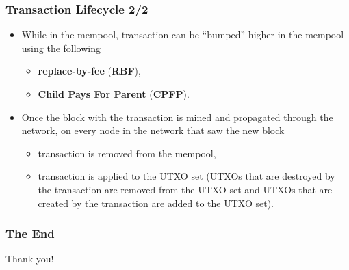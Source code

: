 \documentclass{beamer}
\begin{document}
\begin{frame}
  \frametitle{Transaction Lifecycle 2/2}
  \begin{itemize}
  \item While in the mempool, transaction can be ``bumped'' higher in the mempool
    using the following
    \begin{itemize}
    \item \textbf{replace-by-fee} (\textbf{RBF}),
    \item \textbf{Child Pays For Parent} (\textbf{CPFP}).
    \end{itemize}
  \item Once the block with the transaction is mined and propagated through the
    network, on every node in the network that saw the new block
    \begin{itemize}
    \item transaction is removed from the mempool,
    \item transaction is applied to the UTXO set (UTXOs that are destroyed by
      the transaction are removed from the UTXO set and UTXOs that are created
      by the transaction are added to the UTXO set).
    \end{itemize}
  \end{itemize}
\end{frame}

\begin{frame}
  \frametitle{The End}
  \begin{center}
    Thank you!
  \end{center}
\end{frame}
\end{document}
